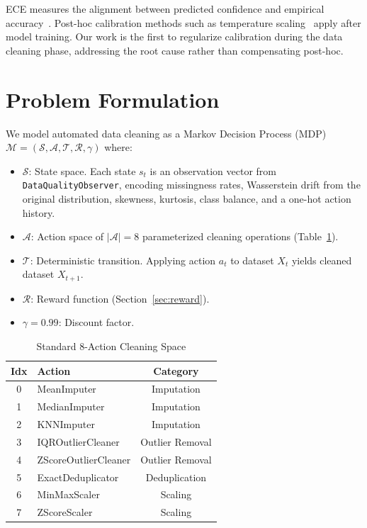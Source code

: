 \documentclass[conference]{IEEEtran}
\begin{document}
ECE measures the alignment between predicted confidence and empirical
accuracy~\cite{guo2017calibration}. Post-hoc calibration methods such as
temperature scaling~\cite{guo2017calibration} apply after model training.
Our work is the first to regularize calibration during the data cleaning
phase, addressing the root cause rather than compensating post-hoc.

\section{Problem Formulation}

We model automated data cleaning as a Markov Decision Process (MDP)
$\mathcal{M} = (\mathcal{S}, \mathcal{A}, \mathcal{T}, \mathcal{R}, \gamma)$
where:

\begin{itemize}
    \item $\mathcal{S}$: State space. Each state $s_t$ is an observation
    vector from \texttt{DataQualityObserver}, encoding missingness rates,
    Wasserstein drift from the original distribution, skewness, kurtosis,
    class balance, and a one-hot action history.
    \item $\mathcal{A}$: Action space of $|\mathcal{A}| = 8$ parameterized
    cleaning operations (Table~\ref{tab:actions}).
    \item $\mathcal{T}$: Deterministic transition. Applying action $a_t$
    to dataset $X_t$ yields cleaned dataset $X_{t+1}$.
    \item $\mathcal{R}$: Reward function (Section~\ref{sec:reward}).
    \item $\gamma = 0.99$: Discount factor.
\end{itemize}

\begin{table}[h]
\caption{Standard 8-Action Cleaning Space}
\label{tab:actions}
\centering
\begin{tabular}{clc}
\toprule
\textbf{Idx} & \textbf{Action} & \textbf{Category} \\
\midrule
0 & MeanImputer    & Imputation \\
1 & MedianImputer  & Imputation \\
2 & KNNImputer     & Imputation \\
3 & IQROutlierCleaner & Outlier Removal \\
4 & ZScoreOutlierCleaner & Outlier Removal \\
5 & ExactDeduplicator & Deduplication \\
6 & MinMaxScaler   & Scaling \\
7 & ZScoreScaler   & Scaling \\
\bottomrule
\end{tabular}
\end{table}
\end{document}
